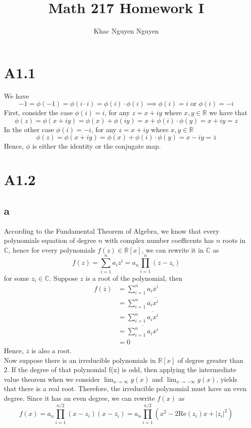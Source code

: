 \documentclass[11pt]{article}
\title{\textbf{Math 217 Homework I}}
\author{Khac Nguyen Nguyen}
\date{}
\begin{document}
\section*{A1.1}
We have
\[
    -1 = \phi(-1) = \phi(i \cdot i) = \phi(i) \cdot \phi(i) \implies \phi(i) = i \text{ or } \phi(i) = -i   
\]
First, consider the case $\phi(i) = i$, for any $z = x + iy$ where $x, y \in \mathbb{R}$
we have that 
\[
    \phi(z) = \phi(x+ iy) = \phi(x) + \phi(iy) = x + \phi(i) \cdot \phi(y) = x + iy = z
\]
In the other case $\phi(i) = -i$, for any $z = x + iy$ where $x, y \in \mathbb{R}$
\[
    \phi(z) = \phi(x + iy) = \phi(x) + \phi(i) \cdot \phi(y) = x - iy = \overline{z}
\]
Hence, $\phi$ is either the identity or the conjugate map.
\newpage
\section*{A1.2}
\subsection*{a}
According to the Fundamental Theorem of Algebra, we know that every polynomials equation of degree $n$ 
with complex number coefficents has $n$ roots in $\mathbb{C}$, hence for every polynomials $f(z) \in \mathbb{R}[x]$, we can rewrite it in $\mathbb{C}$ as 
\[
    f(z) = \sum_{i=1}^n a_iz^i = a_n\prod_{i=1}^n (z-z_i)
\]
for some $z_i \in \mathbb{C}$. Suppose $z$ is a root of the polynomial, then 
\begin{equation*}
    \begin{aligned}
        f(\overline{z}) &= \sum_{i=1}^n a_i \overline{x}^i \\
        &= \sum_{i=1}^n \overline{a_i} \overline{x^i}\\
        &= \sum_{i=1}^n \overline{a_ix^i}\\ 
        &= \overline{\sum_{i=1}^n a_i x^i}  \\
        &= 0
    \end{aligned}
\end{equation*}
Hence, $\overline{z}$ is also a root. \\
Now suppose there is an irreducible polynomials in $\mathbb{R}[x]$ of degree greater than 2. 
If the degree of that polynomial f(x) is odd, then applying the intermediate value theorem
when we consider $\lim_{x \to \infty} g(x)$ and $\lim_{x \to - \infty}g(x)$, yields that there is a real root. 
Therefore, the irreducible polynomial must have an even degree. Since it has an even degree, we can rewrite $f(x)$ as 
\[
    f(x) = a_n\prod_{i=1}^{n/2}(x-z_i)(x-\overline{z_i}) = a_n \prod_{i=1}^{n/2} (x^2 - 2\text{Re}(z_i)x + |z_i|^2)
\]
\end{document}
